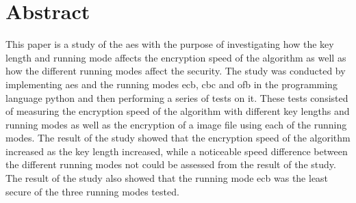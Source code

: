 \documentclass[a4paper, 12pt]{report}
\newcommand{\fakechapter}[2]{%
  \par\setcounter{chapter}{#2}
  \chaptermark{#1}
  \rhead{ }
}
\begin{document}
\chapter*{Abstract}
This paper is a study of the \acrlong{aes} with the purpose of investigating how the key length and running mode affects the encryption speed of the algorithm
as well as how the different running modes affect the security. The study was conducted by implementing \acrshort{aes} and the running modes \acrshort{ecb}, \acrshort{cbc} and \acrshort{ofb} in the programming language \gls{python} and
then performing a series of tests on it. These tests consisted of measuring the encryption speed of the algorithm with different key lengths and running modes as well as the encryption
of a image file using each of the running modes. The result of the study showed that the encryption speed of the algorithm increased as the key length increased, while a noticeable speed difference
between the different running modes not could be assessed from the result of the study. The result of the study also showed that the running mode \acrshort{ecb} was the least secure of the three
running modes tested.


\tableofcontents

\listoffigures

\clearpage

\printglossary


\printglossary[type=\acronymtype, style=super]














\fakechapter{Källförteckning}{7}
\printbibliography[title=Källförteckning]

\clearpage



\end{document}
